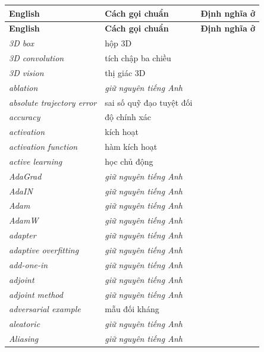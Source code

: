 \documentclass[deep_learning.tex]{subfiles}
\begin{document}
\begingroup\small
\setlength{\LTpre}{0.6em}\setlength{\LTpost}{0.6em}
\begin{longtable}{@{}L{5.2cm}L{5.9cm}L{2.6cm}@{}}
\toprule
\textbf{English} & \textbf{Cách gọi chuẩn} & \textbf{Định nghĩa ở}\\
\midrule
\endfirsthead
\toprule
\textbf{English} & \textbf{Cách gọi chuẩn} & \textbf{Định nghĩa ở}\\
\midrule
\endhead
\bottomrule
\endfoot
\emph{3D box} & hộp 3D & \\
\emph{3D convolution} & tích chập ba chiều & \\
\emph{3D vision} & thị giác 3D & \\
\emph{ablation} & \emph{\color{tiercol}giữ nguyên tiếng Anh} & \\
\emph{absolute trajectory error} & sai số quỹ đạo tuyệt đối & \\
\emph{accuracy} & độ chính xác & \\
\emph{activation} & kích hoạt & \\
\emph{activation function} & hàm kích hoạt & \\
\emph{active learning} & học chủ động & \\
\emph{AdaGrad} & \emph{\color{tiercol}giữ nguyên tiếng Anh} & \\
\emph{AdaIN} & \emph{\color{tiercol}giữ nguyên tiếng Anh} & \\
\emph{Adam} & \emph{\color{tiercol}giữ nguyên tiếng Anh} & \\
\emph{AdamW} & \emph{\color{tiercol}giữ nguyên tiếng Anh} & \\
\emph{adapter} & \emph{\color{tiercol}giữ nguyên tiếng Anh} & \\
\emph{adaptive overfitting} & \emph{\color{tiercol}giữ nguyên tiếng Anh} & \\
\emph{add-one-in} & \emph{\color{tiercol}giữ nguyên tiếng Anh} & \\
\emph{adjoint} & \emph{\color{tiercol}giữ nguyên tiếng Anh} & \\
\emph{adjoint method} & \emph{\color{tiercol}giữ nguyên tiếng Anh} & \\
\emph{adversarial example} & mẫu đối kháng & \\
\emph{aleatoric} & \emph{\color{tiercol}giữ nguyên tiếng Anh} & \\
\emph{Aliasing} & \emph{\color{tiercol}giữ nguyên tiếng Anh} & \\

\end{longtable}
\end{document}
